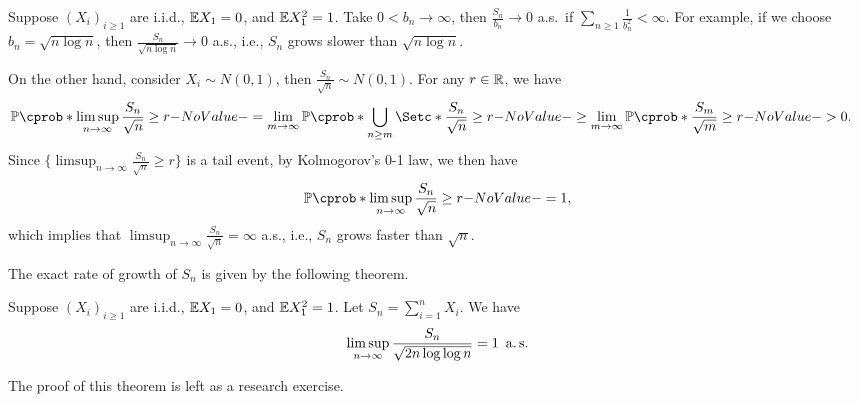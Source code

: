 \documentclass[12pt]{article}
\begin{document}
Suppose $(X_i)_{i\geq 1 }$ are i.i.d., $\E X_1 =0$, and $\E X_1^2=1$. Take $0<b_n\to \infty$, then $\frac{S_n}{b_n} \to 0$ a.s.\ if $\sum_{n\geq 1} \frac{1}{b_n^2}<\infty$. For example, if we choose $b_n=\sqrt{n\log n}$, then $\frac{S_n}{\sqrt{n\log n}}\to 0 $ a.s., i.e., $S_n$ grows slower than $\sqrt{n\log n}$. 

On the other hand, consider $X_i \sim N(0,1)$, then $\frac{S_n}{\sqrt n}\sim N(0,1)$. For any $r\in\mathbb{R}$, we have
\begin{align*}
\P(\limsup_{n\to \infty} \frac{S_n}{\sqrt n}\geq r) &= \lim_{m\to \infty} \P(\bigcup_{n\geq m} \set*{\frac{S_n}{\sqrt n}\geq r}) \geq \lim_{m\to \infty} \P(\frac{S_m}{\sqrt m}\geq r)>0.
\end{align*}
Since $\{\limsup_{n\to \infty} \frac{S_n}{\sqrt n}\geq r\}$ is a tail event, by Kolmogorov’s 0-1 law, we then have 
\begin{align*}
\P(\limsup_{n\to \infty} \frac{S_n}{\sqrt n}\geq r) = 1,
\end{align*}
which implies that $\limsup_{n\to \infty} \frac{S_n}{\sqrt n}=\infty$ a.s., i.e., $S_n$ grows faster than $\sqrt{n}$. 

The exact rate of growth of $S_n$ is given by the following theorem.

\begin{Theorem} 
Suppose $(X_i)_{i\geq 1 }$ are i.i.d., $\E X_1 =0$, and $\E X_1^2=1$. Let $S_n = \sum_{i=1}^n X_i$. We have
\begin{align*}
\limsup_{n \to \infty} \frac{S_n}{\sqrt{2n \log \log n}}=1\ \operatorname{a.s.}
\end{align*}
\end{Theorem}

The proof of this theorem is left as a research exercise. 


%

\end{document}
